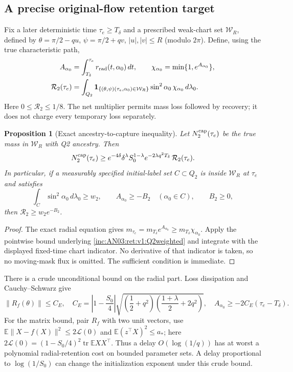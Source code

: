 \documentclass[11pt]{article}
\numberwithin{equation}{section}
\newtheorem{proposition}[theorem]{Proposition}
\theoremstyle{remark}\newtheorem{remark}[theorem]{Remark}
\newcommand{\E}{\mathbb E}
\newcommand{\dd}{\,d}
\newcommand{\1}{\mathbf 1}
\begin{document}
\subsection{A precise original-flow retention target}
Fix a later deterministic time $\tau_e\ge T_\delta$ and a prescribed
weak-chart set $\mathcal W_R$, defined by
$\theta=\pi/2-qu$, $\psi=\pi/2+qv$, $|u|,|v|\le R$ (modulo $2\pi$).
Define, using the true characteristic path,
\begin{align}
 A_{\alpha_0}&=\int_{T_\delta}^{\tau_e}r_{\rm rad}(t,\alpha_0)\dd t,
 \qquad
 \chi_{\alpha_0}=\min\{1,e^{A_{\alpha_0}}\},\nonumber\\
 \mathcal R_2(\tau_e)
 &=\int_{Q_2}\1_{\{(\theta,\psi)(\tau_e,\alpha_0)\in\mathcal W_R\}}
 \sin^2\alpha_0\,\chi_{\alpha_0}\dd\lambda_0.
 \label{inc:AN03:ret:v1:retentionfunctional}
\end{align}
Here $0\le\mathcal R_2\le1/8$. The net multiplier permits mass loss
followed by recovery; it does not charge every temporary loss separately.

\begin{proposition}[Exact ancestry-to-capture inequality]
\label{inc:AN03:ret:v1:retention}
Let $N_2^{\rm cap}(\tau_e)$ be the true mass in $\mathcal W_R$ with Q2
ancestry. Then
\begin{equation}\label{inc:AN03:ret:v1:retentionbound}
 N_2^{\rm cap}(\tau_e)
 \ge e^{-4\delta}\delta^\lambda S_0^{1-\lambda}
 e^{-2\lambda q^2T_\delta}\,\mathcal R_2(\tau_e).
\end{equation}
In particular, if a measurably specified initial-label set $C\subset Q_2$
is inside $\mathcal W_R$ at $\tau_e$ and satisfies
\[
 \int_C\sin^2\alpha_0\dd\lambda_0\ge w_2,
 \qquad A_{\alpha_0}\ge-B_2\quad(\alpha_0\in C),\qquad B_2\ge0,
\]
then $\mathcal R_2\ge w_2e^{-B_2}$.
\end{proposition}
\begin{proof}
The exact radial equation gives
$m_{\tau_e}=m_{T_\delta}e^{A_{\alpha_0}}
\ge m_{T_\delta}\chi_{\alpha_0}$.
Apply the pointwise bound underlying
\eqref{inc:AN03:ret:v1:Q2weighted} and integrate with the displayed
fixed-time chart indicator. No derivative of that indicator is taken,
so no moving-mask flux is omitted. The sufficient condition is immediate.
\end{proof}

There is a crude unconditional bound on the radial part. Loss dissipation
and Cauchy--Schwarz give
\begin{equation}\label{inc:AN03:ret:v1:radialfloor}
 \|R_f(\theta)\|\le C_E,
 \quad C_E=\left|1-\frac{S_0}{4}\right|
 \sqrt{\left(\frac12+q^2\right)
       \left(\frac{1+\lambda}{2}+2q^2\right)},
 \quad A_{\alpha_0}\ge-2C_E(\tau_e-T_\delta).
\end{equation}
For the matrix bound, pair $R_f$ with two unit vectors, use
$\E\|X-f(X)\|^2\le2\mathcal L(0)$ and
$\E(z^\top X)^2\le a_*$; here
$2\mathcal L(0)=(1-S_0/4)^2\operatorname{tr}\E XX^\top$.
Thus a delay $O(\log(1/q))$ has at worst a polynomial radial-retention
cost on bounded parameter sets. A delay proportional to $\log(1/S_0)$
can change the initialization exponent under this crude bound.
\end{document}
